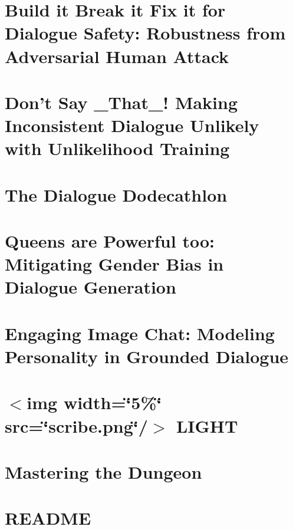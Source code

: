 \documentclass[twoside]{book}
\newcommand{\+}{\discretionary{\mbox{\scriptsize$\hookleftarrow$}}{}{}}
\begin{document}
\chapter{Build it Break it Fix it for Dialogue Safety\+: Robustness from Adversarial Human Attack}
\label{md_projects_dialogue_safety_README}

\chapter{Don’t Say \+\_\+\+That\+\_\+! Making Inconsistent Dialogue Unlikely with Unlikelihood Training}
\label{md_projects_dialogue_unlikelihood_README}

\chapter{The Dialogue Dodecathlon}
\label{md_projects_dodecadialogue_README}

\chapter{Queens are Powerful too\+: Mitigating Gender Bias in Dialogue Generation}
\label{md_projects_genderation_bias_README}

\chapter{Engaging Image Chat\+: Modeling Personality in Grounded Dialogue}
\label{md_projects_image_chat_README}

\chapter{$<$img width=\char`\"{}5\%\char`\"{} src=\char`\"{}scribe.\+png\char`\"{}/$>$ L\+I\+G\+HT}
\label{md_projects_light_README}

\chapter{Mastering the Dungeon}
\label{md_projects_mastering_the_dungeon_README}

\chapter{R\+E\+A\+D\+ME}
\label{md_projects_personachat_README}

\end{document}
